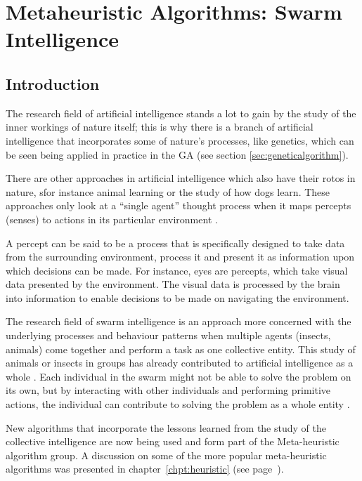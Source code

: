 \chapter[Swarm Intelligence]{Metaheuristic Algorithms: Swarm Intelligence}
\label{chpt:swarm}
\section{Introduction}
The research field of artificial intelligence stands a lot to gain by the study of the inner workings of nature itself; this is why there is a branch of artificial intelligence that incorporates some of nature's processes, like genetics, which can be seen being applied in practice in the GA (see section \ref{sec:geneticalgorithm}).

 There are other approaches in artificial intelligence which also have their rotos in nature, sfor instance animal learning or the study of how dogs learn\cite{DLearning}. These approaches only look at a “single agent” thought process when it maps percepts (senses) to actions in its particular environment \cite{DLearning}. 
 
 A percept can be said to be a process that is specifically designed to take data from the surrounding environment, process it and present it as information upon which decisions can be made\cite{DLearning,AIModernApproach}. For instance, eyes are percepts, which take visual data presented by the environment\cite{DLearning,AIModernApproach}. The visual data is processed by the brain into information to enable decisions to be made on navigating the environment\cite{DLearning,AIModernApproach}.

The research field of swarm intelligence is an approach more concerned with the underlying processes and behaviour patterns when multiple agents (insects, animals) come together and perform a task as one collective entity\cite{DLearning,AIModernApproach,ChaoticSwarmIntel,BeeJobShop}.  This study of animals or insects in groups has already contributed to artificial intelligence as a whole \cite{ChaoticSwarmIntel,BeeJobShop}. Each individual in the swarm might not be able to solve the problem on its own, but by interacting with other individuals and performing primitive actions, the individual can contribute to solving the problem as a whole entity \cite{BeeJobShop}. 

New algorithms that incorporate the lessons learned from the study of the collective intelligence are now being used and form part of the Meta-heuristic algorithm group. A discussion on some of the more popular meta-heuristic algorithms was presented in chapter~\ref{chpt:heuristic} (see page~\pageref{chpt:heuristic}).

